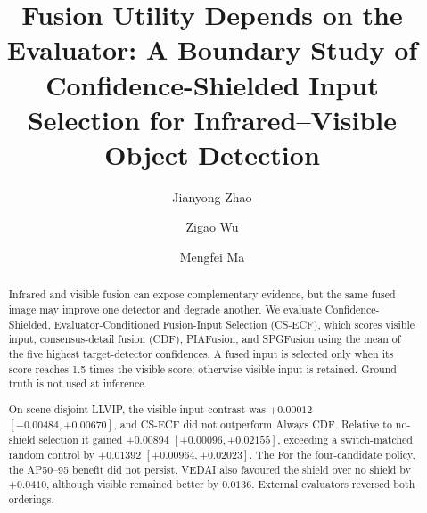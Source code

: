 \documentclass[preprint,11pt]{elsarticle}
\providecommand{\DIFaddtex}[1]{{\protect\color{blue} \sf #1}} %
\providecommand{\DIFdeltex}[1]{{\protect\color{red} \scriptsize #1}} %
\providecommand{\DIFaddbegin}{} %
\providecommand{\DIFaddend}{} %
\providecommand{\DIFdelbegin}{} %
\providecommand{\DIFdelend}{} %
\providecommand{\DIFadd}[1]{\texorpdfstring{\DIFaddtex{#1}}{#1}} %
\providecommand{\DIFdel}[1]{\texorpdfstring{\DIFdeltex{#1}}{}} %
\begin{document}
\sloppy

\begin{frontmatter}

\title{Fusion Utility Depends on the Evaluator: A Boundary Study of Confidence-Shielded Input Selection for Infrared--Visible Object Detection}

\author[AUTHOR]{Jianyong Zhao}

\author[AUTHOR]{Zigao Wu}

\author[AUTHOR]{Mengfei Ma}


\begin{abstract}
Infrared and visible fusion can expose complementary evidence, but the same
fused image may improve one detector and degrade another. We evaluate
Confidence-Shielded, Evaluator-Conditioned Fusion-Input Selection (CS-ECF),
which scores visible input, consensus-detail fusion (CDF), PIAFusion, and
SPGFusion using the mean of the five highest target-detector confidences. A
fused input is selected only when its score reaches 1.5 times the visible
score; otherwise visible input is retained. Ground truth is not used at
inference.

On scene-disjoint LLVIP, the visible-input contrast was \(+0.00012\)
\([-0.00484,+0.00670]\), and CS-ECF did not outperform Always CDF. Relative to
no-shield selection it gained \(+0.00894\) \([+0.00096,+0.02155]\), exceeding
a switch-matched random control by \(+0.01392\)
\([+0.00964,+0.02023]\). \DIFdelbegin \DIFdel{The }\DIFdelend \DIFaddbegin \DIFadd{For the four-candidate policy, the }\DIFaddend AP50--95 benefit
did not persist. VEDAI also favoured the shield over no shield by \(+0.0410\),
although visible remained better by \(0.0136\). External evaluators reversed
both orderings.


\end{abstract}
\end{frontmatter}
\end{document}
